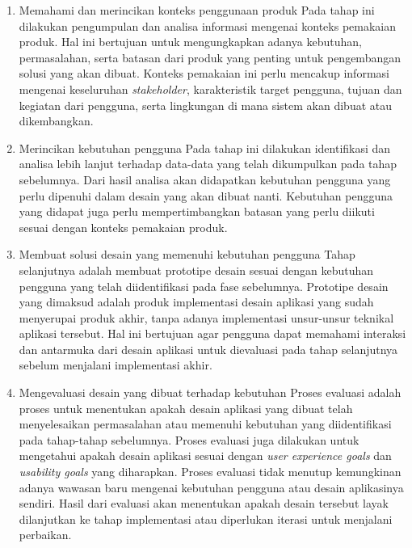 \begin{enumerate}
  \item Memahami dan merincikan konteks penggunaan produk
  \subitem Pada tahap ini dilakukan pengumpulan dan analisa informasi mengenai konteks pemakaian produk. Hal ini bertujuan untuk mengungkapkan adanya kebutuhan, permasalahan, serta batasan dari produk yang penting untuk pengembangan solusi yang akan dibuat. Konteks pemakaian ini perlu mencakup informasi mengenai keseluruhan \textit{stakeholder}, karakteristik target pengguna, tujuan dan kegiatan dari pengguna, serta lingkungan di mana sistem akan dibuat atau dikembangkan.
   
  \item Merincikan kebutuhan pengguna
  \subitem Pada tahap ini dilakukan identifikasi dan analisa lebih lanjut terhadap data-data yang telah dikumpulkan pada tahap sebelumnya. Dari hasil analisa akan didapatkan kebutuhan pengguna yang perlu dipenuhi dalam desain yang akan dibuat nanti. Kebutuhan pengguna yang didapat juga perlu mempertimbangkan batasan yang perlu diikuti sesuai dengan konteks pemakaian produk.
  
  \item Membuat solusi desain yang memenuhi kebutuhan pengguna
  \subitem Tahap selanjutnya adalah membuat prototipe desain sesuai dengan kebutuhan pengguna yang telah diidentifikasi pada fase sebelumnya. Prototipe desain yang dimaksud adalah produk implementasi desain aplikasi yang sudah menyerupai produk akhir, tanpa adanya implementasi unsur-unsur teknikal aplikasi tersebut. Hal ini bertujuan agar pengguna dapat memahami interaksi dan antarmuka dari desain aplikasi untuk dievaluasi pada tahap selanjutnya sebelum menjalani implementasi akhir.
  
  \item Mengevaluasi desain yang dibuat terhadap kebutuhan
  \subitem Proses evaluasi adalah proses untuk menentukan apakah desain aplikasi yang dibuat telah menyelesaikan permasalahan atau memenuhi kebutuhan yang diidentifikasi pada tahap-tahap sebelumnya. Proses evaluasi juga dilakukan untuk mengetahui apakah desain aplikasi sesuai dengan \textit{user experience goals} dan \textit{usability goals} yang diharapkan. Proses evaluasi tidak menutup kemungkinan adanya wawasan baru mengenai kebutuhan pengguna atau desain aplikasinya sendiri. Hasil dari evaluasi akan menentukan apakah desain tersebut layak dilanjutkan ke tahap implementasi atau diperlukan iterasi untuk menjalani perbaikan.

\end{enumerate}



